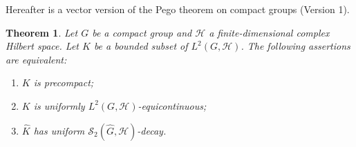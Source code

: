 \documentclass[10pt,a4paper]{amsart}
\newtheorem{theorem}{Theorem}[section]
\begin{document}
Hereafter is a vector version of the Pego theorem on compact groups (Version 1). 
 
\begin{theorem}\label{thm:main}
Let $G$ be a compact group and  $\mathcal{H}$ a finite-dimensional complex Hilbert space. Let  $K$ be a bounded subset of
$L^2(G,\mathcal{H})$. The following assertions are equivalent: 
\begin{enumerate}
\item[(i)] $K$ is precompact;
\item[(ii)] $K$ is uniformly $L^2(G,\mathcal{H})$-equicontinuous;
\item[(iii)] $\widehat K$ has uniform
$\mathscr{S}_2(\widehat{G},\mathcal{H})$-decay.
\end{enumerate}
\end{theorem}
\end{document}
